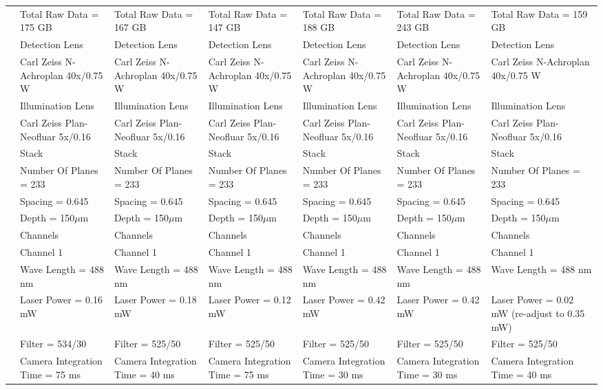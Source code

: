 \documentclass[11pt,a4paper, final]{article}
\begin{document}
\begin{sidewaystable}
\begin{longtable}{@{} l l l l l l l @{}}
& Total Raw Data = 175 GB & Total Raw Data = 167 GB & Total Raw Data = 147 GB & Total Raw Data = 188 GB & Total Raw Data = 243 GB & Total Raw Data = 159 GB\\
& Detection Lens & Detection Lens & Detection Lens & Detection Lens & Detection Lens & Detection Lens\\
& Carl Zeiss N-Achroplan 40x/0.75 W & Carl Zeiss N-Achroplan 40x/0.75 W & Carl Zeiss N-Achroplan 40x/0.75 W & Carl Zeiss N-Achroplan 40x/0.75 W & Carl Zeiss N-Achroplan 40x/0.75 W & Carl Zeiss N-Achroplan 40x/0.75 W\\
& Illumination Lens & Illumination Lens & Illumination Lens & Illumination Lens & Illumination Lens & Illumination Lens\\
& Carl Zeiss Plan-Neofluar 5x/0.16 & Carl Zeiss Plan-Neofluar 5x/0.16 & Carl Zeiss Plan-Neofluar 5x/0.16 & Carl Zeiss Plan-Neofluar 5x/0.16 & Carl Zeiss Plan-Neofluar 5x/0.16 & Carl Zeiss Plan-Neofluar 5x/0.16\\
& Stack & Stack & Stack & Stack & Stack & Stack\\
& Number Of Planes = 233 & Number Of Planes = 233 & Number Of Planes = 233 & Number Of Planes = 233 & Number Of Planes = 233 & Number Of Planes = 233\\
& Spacing = 0.645 & Spacing = 0.645 & Spacing = 0.645 & Spacing = 0.645 & Spacing = 0.645 & Spacing = 0.645\\
& Depth = 150$\mu$m & Depth = 150$\mu$m & Depth = 150$\mu$m & Depth = 150$\mu$m & Depth = 150$\mu$m & Depth = 150$\mu$m\\
& Channels & Channels & Channels & Channels & Channels & Channels\\
& Channel 1 & Channel 1 & Channel 1 & Channel 1 & Channel 1 & Channel 1\\
& Wave Length = 488 nm & Wave Length = 488 nm & Wave Length = 488 nm & Wave Length = 488 nm & Wave Length = 488 nm & Wave Length = 488 nm\\
& Laser Power = 0.16 mW & Laser Power = 0.18 mW & Laser Power = 0.12 mW & Laser Power = 0.42 mW & Laser Power = 0.42 mW & Laser Power = 0.02 mW (re-adjust to 0.35 mW)\\
& Filter = 534/30 & Filter = 525/50 & Filter = 525/50 & Filter = 525/50 & Filter = 525/50 & Filter = 525/50\\
& Camera Integration Time = 75 ms & Camera Integration Time = 40 ms & Camera Integration Time = 75 ms & Camera Integration Time = 30 ms & Camera Integration Time = 30 ms & Camera Integration Time = 40 ms\\

\end{longtable}
\end{sidewaystable}
\end{document}
